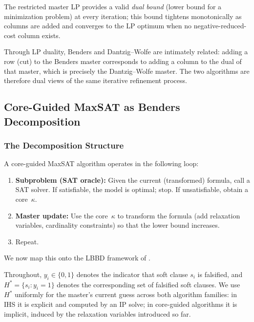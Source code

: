 The restricted master LP provides a valid \emph{dual bound} (lower bound for a
minimization problem) at every iteration; this bound tightens monotonically as
columns are added and converges to the LP optimum when no negative-reduced-cost
column exists.

Through LP duality, Benders and Dantzig--Wolfe are intimately related: adding a
row (cut) to the Benders master corresponds to adding a column to the dual of
that master, which is precisely the Dantzig--Wolfe master. The two algorithms
are therefore dual views of the same iterative refinement process.

\subsection{Core-Guided MaxSAT as Benders Decomposition}
\label{sec:benders}

\subsubsection{The Decomposition Structure}

A core-guided MaxSAT algorithm operates in the following loop:
\begin{enumerate}
\item \textbf{Subproblem (SAT oracle):} Given the current (transformed) formula, call a SAT solver. If satisfiable, the model is optimal; stop. If unsatisfiable, obtain a core~$\kappa$.
\item \textbf{Master update:} Use the core~$\kappa$ to transform the formula (add relaxation variables, cardinality constraints) so that the lower bound increases.
\item Repeat.
\end{enumerate}

We now map this onto the LBBD framework of \citet{hooker2003logic}.

Throughout, $y_i \in \{0,1\}$ denotes the indicator that soft clause $s_i$ is
falsified, and $H^* = \{s_i : y_i = 1\}$ denotes the corresponding set of
falsified soft clauses. We use $H^*$ uniformly for the master's current
guess across both algorithm families: in IHS it is explicit and computed by an
IP solve; in core-guided algorithms it is implicit, induced by the relaxation
variables introduced so far.

